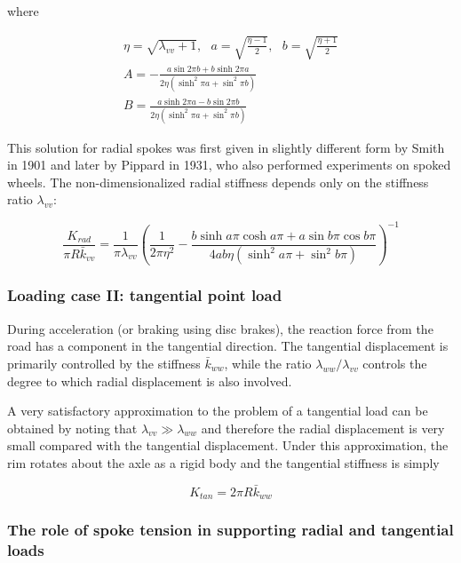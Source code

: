 \documentclass[../thesis.tex]{subfiles}
\begin{document}
where

\begin{gather*}
\eta=\sqrt{\lambda_{vv} + 1}, \,\,\,\, a=\sqrt{\frac{\eta-1}{2}}, \,\,\,\, b=\sqrt{\frac{\eta+1}{2}}\\
A = -\frac{a\sin{2\pi b} + b\sinh{2\pi a}}{2\eta(\sinh^2{\pi a} + \sin^2{\pi b})}\\
B =  \frac{a\sinh{2\pi a} - b\sin{2\pi b}}{2\eta(\sinh^2{\pi a} + \sin^2{\pi b})}
\end{gather*}

This solution for radial spokes was first given in slightly different form by Smith\cite{Smith} in 1901 and later by Pippard\cite{Pippard} in 1931, who also performed experiments on spoked wheels. The non-dimensionalized radial stiffness depends only on the stiffness ratio $\lambda_{vv}$:

\begin{equation}
\label{eq:Krad}
\frac{K_{rad}}{\pi R \bar{k}_{vv}} =
    \frac{1}{\pi\lambda_{vv}} \left(\frac{1}{2\pi\eta^2}
                                    -\frac{b\sinh{a\pi}\cosh{a\pi} + a\sin{b\pi}\cos{b\pi}}
                                     {4ab\eta (\sinh^2{a\pi} + \sin^2{b\pi})} \right)^{-1}
\end{equation}

\subsubsection{Loading case II: tangential point load}

During acceleration (or braking using disc brakes), the reaction force from the road has a component in the tangential direction. The tangential displacement is primarily controlled by the stiffness $\bar{k}_{ww}$, while the ratio $\lambda_{ww}/\lambda_{vv}$ controls the degree to which radial displacement is also involved.

A very satisfactory approximation to the problem of a tangential load can be obtained by noting that $\lambda_{vv}\gg\lambda_{ww}$ and therefore the radial displacement is very small compared with the tangential displacement. Under this approximation, the rim rotates about the axle as a rigid body and the tangential stiffness is simply

\begin{equation}
\label{eq:Ktan}
K_{tan} = 2\pi R \bar{k}_{ww}
\end{equation}

\subsubsection{The role of spoke tension in supporting radial and tangential loads}
\end{document}
